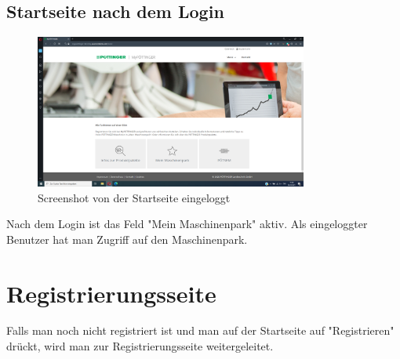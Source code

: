 \subsection{Startseite nach dem Login}
\begin{figure}[H]
	\centerline{
		\includegraphics[width=0.8\textwidth]{./grafiken/erm_home_logged_in.png}
	}
	\vskip0pt
	\caption{Screenshot von der Startseite eingeloggt} \label{fig:homeLoggedIn}
\end{figure}
Nach dem Login ist das Feld "Mein Maschinenpark" aktiv. Als eingeloggter Benutzer hat man Zugriff auf den Maschinenpark. 
\section{Registrierungsseite}
Falls man noch nicht registriert ist und man auf der Startseite auf "Registrieren" drückt, wird man zur Registrierungsseite weitergeleitet.
